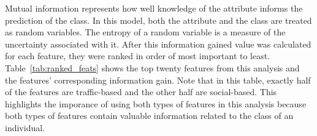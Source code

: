 \documentclass[12pt]{report}
\begin{document}
Mutual information represents how well knowledge of the attribute informs the prediction of the class.
In this model, both the attribute and the class are treated as random variables.
The entropy of a random variable is a measure of the uncertainty associated with it.
After this information gained value was calculated for each feature, they were ranked in order of most important to least.
Table~\ref{tab:ranked_feats} shows the top twenty features from this analysis and the features' corresponding information gain.  
Note that in this table, exactly half of the features are traffic-based and the other half are social-based.
This highlights the imporance of using both types of features in this analysis because both types of features contain valuable information related to the class of an individual.

\begin{table}[t]
\caption{Top 20 features ranked by the information gain.}
\centering
\label{tab:ranked_feats}
\end{table}
\end{document}
